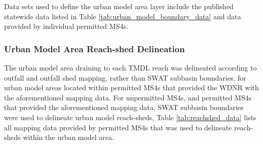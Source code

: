 Data sets used to define the urban model area layer include the published statewide data listed in Table \ref{tab:urban_model_boundary_data} and data provided by individual permitted MS4s.

\subsubsection{Urban Model Area Reach-shed Delineation}

The urban model area draining to each TMDL reach was delineated according to outfall and outfall shed mapping, rather than SWAT subbasin boundaries, for urban model areas located within permitted MS4s that provided the WDNR with the aforementioned mapping data. 
For unpermitted MS4s, and permitted MS4s that provided the aforementioned mapping data, SWAT subbasin boundaries were used to delineate urban model reach-sheds, Table \ref{tab:reachshed_data} lists all mapping data provided by permitted MS4s that was used to delineate reach-sheds within the urban model area.  



